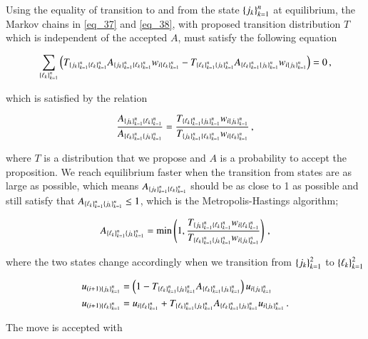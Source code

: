 \documentclass[11pt,english,a4paper]{article}
\begin{document}
\begin{flushleft}
Using the equality of transition to and from the state $\left\lbrace{j_k}\right\rbrace_{k=1}^n$ at equilibrium,  the Markov chains in \eqref{eq_37} and \eqref{eq_38}, with proposed transition distribution $T$ which is independent of the accepted $A$, must satisfy the following equation

\begin{align*}
\sum_{\left\lbrace{\ell_k}\right\rbrace_{k=1}^n}\left({T_{\left\lbrace{j_k}\right\rbrace_{k=1}^n \left\lbrace{\ell_k}\right\rbrace_{k=1}^n}A_{\left\lbrace{j_k}\right\rbrace_{k=1}^n \left\lbrace{\ell_k}\right\rbrace_{k=1}^n} w_{i\left\lbrace{\ell_k}\right\rbrace_{k=1}^n} - T_{\left\lbrace{\ell_k}\right\rbrace_{k=1}^n \left\lbrace{j_k}\right\rbrace_{k=1}^n}A_{\left\lbrace{\ell_k}\right\rbrace_{k=1}^n \left\lbrace{j_k}\right\rbrace_{k=1}^n} w_{i\left\lbrace{j_k}\right\rbrace_{k=1}^n}}\right) = 0 \,,
\end{align*}


which is satisfied by the relation

\begin{align*}
\frac{A_{\left\lbrace{j_k}\right\rbrace_{k=1}^n \left\lbrace{\ell_k}\right\rbrace_{k=1}^n}}{A_{\left\lbrace{\ell_k}\right\rbrace_{k=1}^n \left\lbrace{j_k}\right\rbrace_{k=1}^n}} = \frac{T_{\left\lbrace{\ell_k}\right\rbrace_{k=1}^n \left\lbrace{j_k}\right\rbrace_{k=1}^n}w_{i\left\lbrace{j_k}\right\rbrace_{k=1}^n}}{T_{\left\lbrace{j_k}\right\rbrace_{k=1}^n \left\lbrace{\ell_k}\right\rbrace_{k=1}^n}w_{i\left\lbrace{\ell_k}\right\rbrace_{k=1}^n}} \,,
\end{align*}

where $T$ is a distribution that we propose and $A$ is a probability to accept the proposition. We reach equilibrium faster when the transition from states are as large as possible, which means $A_{\left\lbrace{j_k}\right\rbrace_{k=1}^n \left\lbrace{\ell_k}\right\rbrace_{k=1}^n}$ should be as close to 1 as possible and still satisfy that $A_{\left\lbrace{\ell_k}\right\rbrace_{k=1}^n \left\lbrace{j_k}\right\rbrace_{k=1}^n} \leq 1$, which is the Metropolis-Hastings algorithm;

\begin{align}
A_{\kr{\ell_k}_{k=1}^n\kr{j_k}_{k=1}^n} = \min\p{1,\frac{T_{\kr{j_k}_{k=1}^n\kr{\ell_k}_{k=1}^n}w_{i\kr{\ell_k}_{k=1}^n}}{T_{\kr{\ell_k}_{k=1}^n\kr{j_k}_{k=1}^n}w_{i\kr{j_k}_{k=1}^n}}}\,,
\label{eq_46}
\end{align}

where the two states change accordingly when we transition from $\left\lbrace{j_k}\right\rbrace_{k=1}^2$ to $\left\lbrace{\ell_k}\right\rbrace_{k=1}^2$ 

\begin{align*}
u_{(i+1)\left\lbrace{j_k}\right\rbrace_{k=1}^n} &= \left({1-T_{\left\lbrace{\ell_k}\right\rbrace_{k=1}^n\left\lbrace{j_k}\right\rbrace_{k=1}^n} A_{\left\lbrace{\ell_k}\right\rbrace_{k=1}^n\left\lbrace{j_k}\right\rbrace_{k=1}^n}}\right) u_{i\left\lbrace{j_k}\right\rbrace_{k=1}^n}
\\
u_{(i+1)\left\lbrace{\ell_k}\right\rbrace_{k=1}^n} &= u_{i\left\lbrace{\ell_k}\right\rbrace_{k=1}^n} + T_{\left\lbrace{\ell_k}\right\rbrace_{k=1}^n\left\lbrace{j_k}\right\rbrace_{k=1}^n}A_{\left\lbrace{\ell_k}\right\rbrace_{k=1}^n\left\lbrace{j_k}\right\rbrace_{k=1}^n} u_{i\left\lbrace{j_k}\right\rbrace_{k=1}^n} \,.
\end{align*} 

The move is accepted with 


\end{flushleft}
\end{document}
